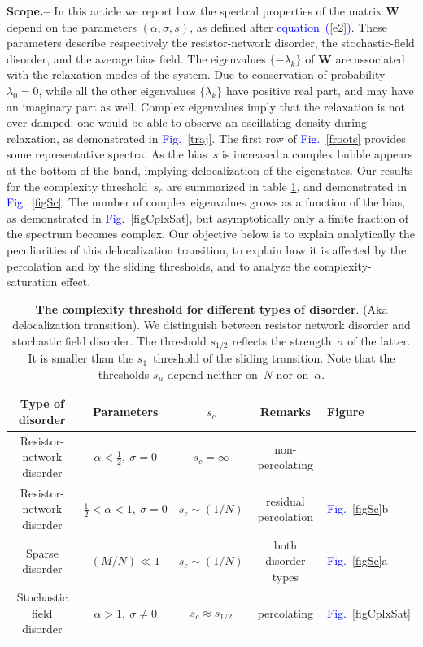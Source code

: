 \documentclass[aps,pre,floats,floatfix,twocolumn]{revtex4}
\newcommand{\Eq}[1]{\textcolor{blue}{{equation}\!~(\ref{#1})}}
\newcommand{\Fig}[1]{\textcolor{blue}{Fig.}\!\!~\ref{#1}}
\newcommand{\sect}[1]{{\bf #1.-- }}
\begin{document}
\sect{Scope} 
In this article we report how the spectral properties of the matrix $\bm{W}$ 
depend on the parameters $(\alpha,\sigma,s)$, as defined after \Eq{e2}. 
These parameters describe respectively the resistor-network disorder, 
the stochastic-field disorder, and the average bias field.    
The eigenvalues $\{-\lambda_k\}$ of $\bm{W}$ are associated 
with the relaxation modes of the system. 
Due to conservation of probability ${\lambda_0=0}$, 
while all the other eigenvalues ${\{\lambda_k\}}$ have positive 
real part, and may have an imaginary part as well. 
Complex eigenvalues imply that the relaxation is not over-damped: 
one would be able to observe an oscillating density during relaxation, 
as demonstrated in \Fig{traj}.    
%
The first row of \Fig{froots} provides some representative spectra.
As the bias~$s$ is increased a complex bubble appears at the bottom 
of the band, implying delocalization of the eigenstates.   
Our results for the complexity threshold~$s_c$ are summarized 
in table \ref{tbl}, and demonstrated in \Fig{figSc}. 
The number of complex eigenvalues grows as a function 
of the bias, as demonstrated in \Fig{figCplxSat},  
but asymptotically only a finite fraction of the spectrum becomes complex. 
%
Our objective below is to explain analytically the 
peculiarities of this delocalization transition, 
to explain how it is affected by the percolation and by the sliding thresholds, 
and to analyze the complexity-saturation effect.  




\begin{table}

\begin{tabular}{|c|c|c|c|l|}
\hline 
Type of disorder & Parameters &  $s_c$ & Remarks & Figure \\ 
\hline
Resistor-network disorder & $\alpha{<}\frac{1}{2}, \ \sigma{=}0$    &  $s_c = \infty$ &  non-percolating &   \\
Resistor-network disorder & $\frac{1}{2}{<}\alpha{<}1, \ \sigma{=}0$   &  $s_c \sim (1/N)$ & residual percolation & \Fig{figSc}b \\
Sparse disorder & $(M/N) \ll 1$ &  $s_c \sim (1/N)$  &  both disorder types  &  \Fig{figSc}a \\
Stochastic field disorder & $\alpha{>}1, \ \sigma{\ne}0$ & $s_c \approx s_{1/2}$ & percolating & \Fig{figCplxSat} \\
\hline
\end{tabular}

\caption{\label{tbl}
{\bf The complexity threshold for different types of disorder}. (Aka delocalization transition). 
We distinguish between resistor network disorder and stochastic field disorder.  
The threshold $s_{1/2}$ reflects the strength~$\sigma$ of the latter. 
It is smaller than the $s_1$~threshold of the sliding transition.    
Note that the thresholds $s_{\mu}$ depend neither on~$N$ nor on~$\alpha$. 
} 

\end{table}
\end{document}
